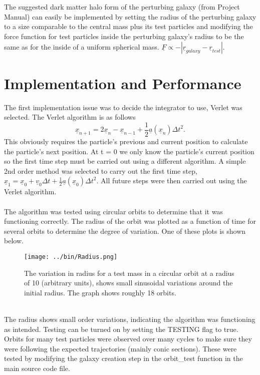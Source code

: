 \documentclass[10pt,a4paper]{article}
\begin{document}
\\
\\
The suggested dark matter halo form of the perturbing galaxy (from Project Manual) can easily be implemented by setting the radius of the perturbing galaxy to a size comparable to the central mass plus its test particles and modifying the force function for test particles inside the perturbing galaxy's radius to be the same as for the inside of a uniform spherical mass. $\underline{F} \propto -|\underline{r}_{galaxy}-\underline{r}_{test}|$.
\clearpage
\section{Implementation and Performance}
The first implementation issue was to decide the integrator to use, Verlet was selected. The Verlet algorithm is as follows 
\begin{equation}
	\underline{x}_{n+1} = 2 \underline{x}_n - \underline{x}_{n-1} + \frac{1}{2}  \underline{a}(\underline{x}_n) {\Delta t }^ 2 .
\end{equation}  
This obviously requires the particle's previous and current position to calculate the particle's next position. At t = 0 we only know the particle's current position so the first time step must be carried out using a different algorithm. A simple 2nd order method was selected to carry out the first time step, $\underline{x}_{1} =  \underline{x}_0 + \underline{v}_0 {\Delta t} + \frac{1}{2}  \underline{a}(\underline{x}_0) {\Delta t }^ 2 .$ All future steps were then carried out using the Verlet algorithm.
\\
\\
The algorithm was tested using circular orbits to determine that it was functioning correctly. The radius of the orbit was plotted as a function of time for several orbits to determine the degree of variation. One of these plots is shown below.
\begin{figure}[ht!]
\centering
\texttt{[image: ../bin/Radius.png]}
\caption{The variation in radius for a test mass in a circular orbit at a radius of 10 (arbitrary units), shows small sinusoidal variations around the initial radius. The graph shows roughly 18 orbits.
\label{radiusfig}}
\end{figure}
\\
The radius shows small order variations, indicating the algorithm was functioning as intended. Testing can be turned on by setting the TESTING flag to true. Orbits for many test particles were observed over many cycles to make sure they were following the expected trajectories (mainly conic sections). These were tested by modifying the galaxy creation step in the orbit\_test function in the main source code file.
\end{document}
